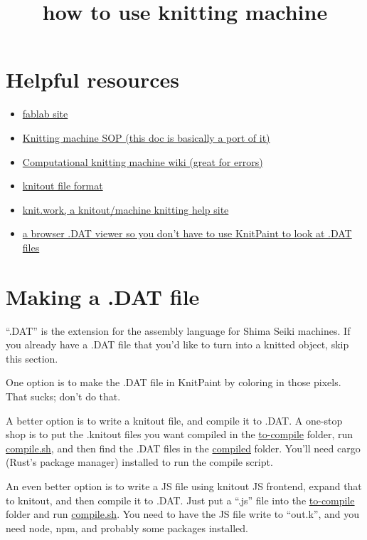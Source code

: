 \documentclass[acmsmall,screen,review,anonymous,nonacm]{acmart}
\title{how to use knitting machine}
\begin{document}
\maketitle

\section{Helpful resources}
\begin{itemize}
    \item \href{https://fablab.cs.washington.edu/}{fablab site}
    \item \href{../SOP.pdf}{Knitting machine SOP (this doc is basically a port of it)}
    \item \href{https://wiki.computationalmachineknitting.org/app/page/1GeyC58yhlU_17IHSqfhCyQipoM_dPPBK?p=1GeyC58yhlU_17IHSqfhCyQipoM_dPPBK}{Computational knitting machine wiki
        (great for errors)}
    \item \href{https://textiles-lab.github.io/knitout/knitout.html}{knitout file format}
    \item \href{https://knit.work/}{knit.work, a knitout/machine knitting help site}
    \item \href{../dat_viewer.html}{a browser .DAT viewer so you don't have to use KnitPaint to look at .DAT files}
\end{itemize}

\section{Making a .DAT file}

``.DAT'' is the extension for the assembly language for Shima Seiki machines.
If you already have a .DAT file that you'd like to turn into a knitted object,
skip this section.

One option is to make the .DAT file in KnitPaint by coloring in those pixels. That
sucks; don't do that.

A better option is to write a knitout file, and compile it to .DAT. A one-stop shop is to put
the .knitout files you want compiled in the \href{../to-compile}{to-compile} folder, run \href{../compile.sh}{compile.sh},
and then find the .DAT files in  the \href{../compiled}{compiled} folder. You'll need cargo (Rust's package manager) installed to
run the compile script.

An even better option is to write a JS file using knitout JS frontend, expand that to knitout, and
then compile it to .DAT. Just put a ``.js'' file into the \href{../to-compile}{to-compile} folder
and run \href{../compile.sh}{compile.sh}. You need to have the JS file write to ``out.k'', and you
need node, npm, and probably some packages installed.
 
\end{document}
